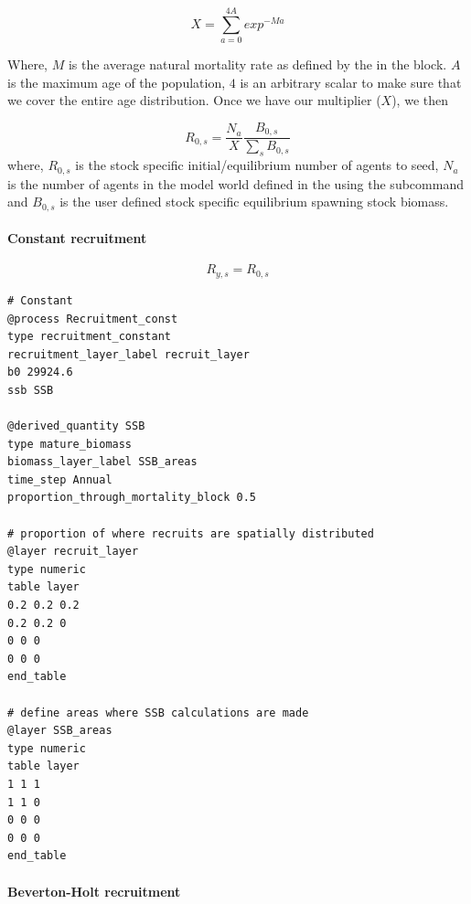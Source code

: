 \begin{equation}
	X = \sum_{a = 0}^{4A}exp^{-M a}
\end{equation}

Where, $M$ is the average natural mortality rate as defined by the  in the  block. $A$ is the maximum age of the population, $4$ is an arbitrary scalar to make sure that we cover the entire age distribution. Once we have our multiplier ($X$), we then


\begin{equation}
R_{0,s} = \frac{N_a}{X} \frac{B_{0,s}}{\sum_s B_{0,s}}
\end{equation}
where, $R_{0,s}$ is the stock specific initial/equilibrium number of agents to seed, $N_a$ is the number of agents in the model world defined in the  using the subcommand  and $B_{0,s}$ is the user defined stock specific equilibrium spawning stock biomass.

\paragraph{Constant recruitment}\label{subsubsec:constant-recruitment}

\begin{equation}
	R_{y,s} = R_{0,s}
\end{equation}

{\small{\begin{verbatim}
# Constant
@process Recruitment_const
type recruitment_constant
recruitment_layer_label recruit_layer
b0 29924.6 
ssb SSB

@derived_quantity SSB
type mature_biomass
biomass_layer_label SSB_areas
time_step Annual
proportion_through_mortality_block 0.5

# proportion of where recruits are spatially distributed
@layer recruit_layer
type numeric
table layer
0.2 0.2 0.2
0.2 0.2 0
0 0 0
0 0 0	
end_table

# define areas where SSB calculations are made
@layer SSB_areas
type numeric
table layer
1 1 1
1 1 0
0 0 0
0 0 0	
end_table
\end{verbatim}}}
	
\paragraph{Beverton-Holt recruitment}\label{subsubsec:bev-holt-recruitment}

